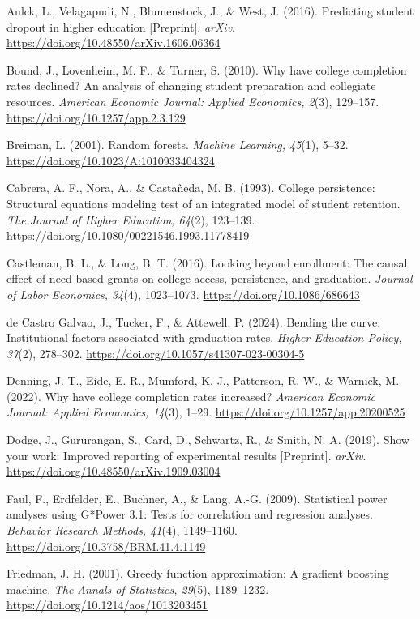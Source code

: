 \documentclass[12pt,a4paper]{article}
\begin{document}
Aulck, L., Velagapudi, N., Blumenstock, J., \& West, J. (2016). Predicting student dropout in higher education [Preprint]. \textit{arXiv}. \url{https://doi.org/10.48550/arXiv.1606.06364}

Bound, J., Lovenheim, M. F., \& Turner, S. (2010). Why have college completion rates declined? An analysis of changing student preparation and collegiate resources. \textit{American Economic Journal: Applied Economics, 2}(3), 129--157. \url{https://doi.org/10.1257/app.2.3.129}

Breiman, L. (2001). Random forests. \textit{Machine Learning, 45}(1), 5--32. \url{https://doi.org/10.1023/A:1010933404324}

Cabrera, A. F., Nora, A., \& Casta\~neda, M. B. (1993). College persistence: Structural equations modeling test of an integrated model of student retention. \textit{The Journal of Higher Education, 64}(2), 123--139. \url{https://doi.org/10.1080/00221546.1993.11778419}

Castleman, B. L., \& Long, B. T. (2016). Looking beyond enrollment: The causal effect of need-based grants on college access, persistence, and graduation. \textit{Journal of Labor Economics, 34}(4), 1023--1073. \url{https://doi.org/10.1086/686643}

de Castro Galvao, J., Tucker, F., \& Attewell, P. (2024). Bending the curve: Institutional factors associated with graduation rates. \textit{Higher Education Policy, 37}(2), 278--302. \url{https://doi.org/10.1057/s41307-023-00304-5}

Denning, J. T., Eide, E. R., Mumford, K. J., Patterson, R. W., \& Warnick, M. (2022). Why have college completion rates increased? \textit{American Economic Journal: Applied Economics, 14}(3), 1--29. \url{https://doi.org/10.1257/app.20200525}

Dodge, J., Gururangan, S., Card, D., Schwartz, R., \& Smith, N. A. (2019). Show your work: Improved reporting of experimental results [Preprint]. \textit{arXiv}. \url{https://doi.org/10.48550/arXiv.1909.03004}

Faul, F., Erdfelder, E., Buchner, A., \& Lang, A.-G. (2009). Statistical power analyses using G*Power 3.1: Tests for correlation and regression analyses. \textit{Behavior Research Methods, 41}(4), 1149--1160. \url{https://doi.org/10.3758/BRM.41.4.1149}

Friedman, J. H. (2001). Greedy function approximation: A gradient boosting machine. \textit{The Annals of Statistics, 29}(5), 1189--1232. \url{https://doi.org/10.1214/aos/1013203451}
\end{document}
